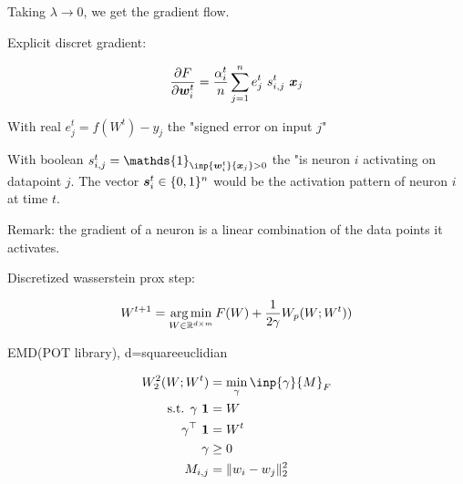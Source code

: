 Taking $\lambda \rightarrow 0$, we get the gradient flow.

Explicit discret gradient:

\begin{equation}
	\frac{\partial F}{\partial {\bm{w}}^t_i} = \frac{\alpha^t_i}{n} \sum_{j=1}^{n} e^t_j ~ s^t_{i, j} ~ {\bm{x}}_j
\end{equation}

With real $e^t_j = f(W^t) - y_j$ the "signed error on input $j$"

With boolean $s^t_{i, j} = \mathds{1}_{\inp{\vw^t_i}{\vx_j} > 0}$ the "is neuron $i$ activating on datapoint $j$. The vector ${\bm{s}}^t_{i} \in \{0, 1\}^n$ would be the activation pattern of neuron $i$ at time $t$.

Remark: the gradient of a neuron is a linear combination of the data points it activates.

Discretized wasserstein prox step:

\begin{equation}
	W^{t+1} = \operatorname*{arg\,min}_{W \in \mathbb{R}^{d \times m}} F(W) + \frac{1}{2 \gamma} W_p(W; W^t))
\end{equation}


EMD(POT library), d=squareeuclidian

\begin{align}
	W_2^2(W; W^t) &= \min_{\gamma} \inp{\gamma}{M}_F \\
	\text{s.t.  } \gamma ~ \mathbf{1} &= W \\
	\gamma^\top ~ \mathbf{1} &= W^t \\
	\gamma &\geq 0 \\
	M_{i, j} &= \lVert w_i - w_j \rVert^2_2
\end{align}

